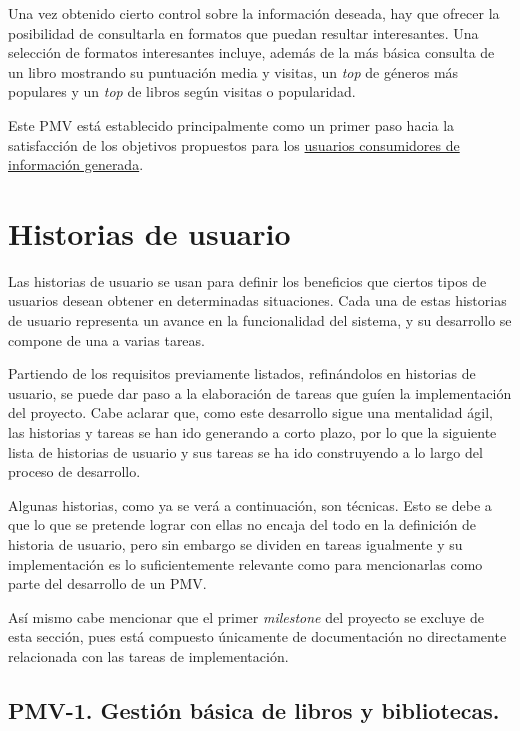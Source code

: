 Una vez obtenido cierto control sobre la información deseada, hay que ofrecer la posibilidad de consultarla en formatos que puedan resultar interesantes. Una selección de formatos interesantes incluye, además de la más básica consulta de un libro mostrando su puntuación media y visitas, un \textit{top} de géneros más populares y un \textit{top} de libros según visitas o popularidad.

Este PMV está establecido principalmente como un primer paso hacia la satisfacción de los objetivos propuestos para los \href{https://github.com/Anglepi/My-Many-Reads/blob/main/docs/md/personas/information-consumer.md}{usuarios consumidores de información generada}.

\section{Historias de usuario}

Las historias de usuario se usan para definir los beneficios que ciertos tipos de usuarios desean obtener en determinadas situaciones. Cada una de estas historias de usuario representa un avance en la funcionalidad del sistema, y su desarrollo se compone de una a varias tareas.

Partiendo de los requisitos previamente listados, refinándolos en historias de usuario, se puede dar paso a la elaboración de tareas que guíen la implementación del proyecto. Cabe aclarar que, como este desarrollo sigue una mentalidad ágil, las historias y tareas se han ido generando a corto plazo, por lo que la siguiente lista de historias de usuario y sus tareas se ha ido construyendo a lo largo del proceso de desarrollo.

Algunas historias, como ya se verá a continuación, son técnicas. Esto se debe a que lo que se pretende lograr con ellas no encaja del todo en la definición de historia de usuario, pero sin embargo se dividen en tareas igualmente y su implementación es lo suficientemente relevante como para mencionarlas como parte del desarrollo de un PMV.

Así mismo cabe mencionar que el primer \textit{milestone} del proyecto se excluye de esta sección, pues está compuesto únicamente de documentación no directamente relacionada con las tareas de implementación.

\subsection{PMV-1. Gestión básica de libros y bibliotecas.}

